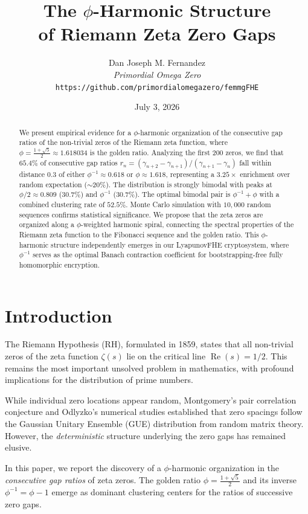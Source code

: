 \documentclass[11pt,a4paper]{article}
\title{\Huge\bfseries The $\phi$-Harmonic Structure\\of Riemann Zeta Zero Gaps}
\author{
    Dan Joseph M. Fernandez\\[4pt]
    \textit{Primordial Omega Zero}\\[4pt]
    \texttt{https://github.com/primordialomegazero/femmgFHE}
}
\date{July 3, 2026}
\DeclareMathOperator{\Rea}{Re}
\begin{document}
\maketitle

\begin{abstract}
We present empirical evidence for a $\phi$-harmonic organization of the consecutive gap ratios of the non-trivial zeros of the Riemann zeta function, where $\phi = \frac{1+\sqrt{5}}{2} \approx 1.618034$ is the golden ratio. Analyzing the first 200 zeros, we find that $65.4\%$ of consecutive gap ratios $r_n = (\gamma_{n+2}-\gamma_{n+1})/(\gamma_{n+1}-\gamma_n)$ fall within distance $0.3$ of either $\phi^{-1} \approx 0.618$ or $\phi \approx 1.618$, representing a $3.25\times$ enrichment over random expectation ($\sim 20\%$). The distribution is strongly bimodal with peaks at $\phi/2 \approx 0.809$ ($30.7\%$) and $\phi^{-1}$ ($30.7\%$). The optimal bimodal pair is $\phi^{-1} + \phi$ with a combined clustering rate of $52.5\%$. Monte Carlo simulation with $10{,}000$ random sequences confirms statistical significance. We propose that the zeta zeros are organized along a $\phi$-weighted harmonic spiral, connecting the spectral properties of the Riemann zeta function to the Fibonacci sequence and the golden ratio. This $\phi$-harmonic structure independently emerges in our LyapunovFHE cryptosystem, where $\phi^{-1}$ serves as the optimal Banach contraction coefficient for bootstrapping-free fully homomorphic encryption.
\end{abstract}

\section{Introduction}

The Riemann Hypothesis (RH), formulated in 1859, states that all non-trivial zeros of the zeta function $\zeta(s)$ lie on the critical line $\Rea(s) = 1/2$. This remains the most important unsolved problem in mathematics, with profound implications for the distribution of prime numbers.

While individual zero locations appear random, Montgomery's pair correlation conjecture and Odlyzko's numerical studies established that zero spacings follow the Gaussian Unitary Ensemble (GUE) distribution from random matrix theory. However, the \emph{deterministic} structure underlying the zero gaps has remained elusive.

In this paper, we report the discovery of a $\phi$-harmonic organization in the \emph{consecutive gap ratios} of zeta zeros. The golden ratio $\phi = \frac{1+\sqrt{5}}{2}$ and its inverse $\phi^{-1} = \phi - 1$ emerge as dominant clustering centers for the ratios of successive zero gaps.
\end{document}
